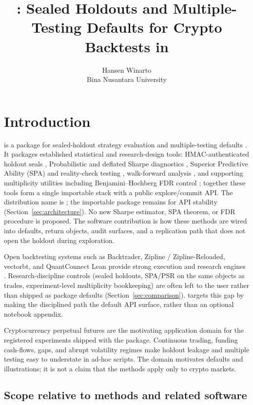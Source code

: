 \documentclass[article]{jss}
\author{
  Hansen Winarto\\
  Bina Nusantara University
}
\title{\pkg{sealedge}: Sealed Holdouts and Multiple-Testing Defaults for Crypto Backtests in \proglang{Python}}
\begin{document}
\section[Introduction]{Introduction} \label{sec:intro}

 is a  package for sealed-holdout strategy
evaluation and multiple-testing defaults
\citep{sealedge,Python}.  It packages established statistical and research-design
tools: HMAC-authenticated holdout seals \citep{Krawczyk+etal:1997},
Probabilistic and deflated Sharpe diagnostics
\citep{Bailey+LopezDePrado:2012,Bailey+LopezDePrado:2014}, Superior Predictive
Ability (SPA) and reality-check testing \citep{Hansen:2005,White:2000},
walk-forward analysis \citep{Pardo:2008}, and supporting multiplicity utilities
including Benjamini--Hochberg FDR control
\citep{Benjamini+Hochberg:1995}; together these
  tools form
a single importable stack with a public explore/commit API.  The distribution
name is ; the importable package remains  for API
stability (Section~\ref{sec:architecture}).  No new Sharpe estimator, SPA
theorem, or FDR procedure is proposed.  The software contribution is how these
methods are wired into defaults, return objects, audit surfaces, and a
replication path that does not open the holdout during exploration.

Open backtesting systems such as Backtrader, Zipline / Zipline-Reloaded,
vectorbt, and QuantConnect Lean provide strong execution and research engines
\citep{Backtrader,Zipline,vectorbt,Lean}.  Research-discipline controls
(sealed holdouts, SPA/PSR on the same objects as trades, experiment-level
multiplicity bookkeeping) are often left to the user rather than shipped as
package defaults (Section~\ref{sec:comparison}).   targets this gap by making the disciplined path the default
API surface, rather than an optional notebook appendix.

Cryptocurrency perpetual futures are the motivating application domain for the
registered experiments shipped with the package.  Continuous trading, funding
cash-flows, gaps, and abrupt volatility regimes make holdout leakage and
multiple testing easy to understate in ad-hoc scripts.  The domain motivates
defaults and illustrations; it is not a claim that the methods apply only to
crypto markets.

\subsection{Scope relative to methods and related software}
\end{document}
